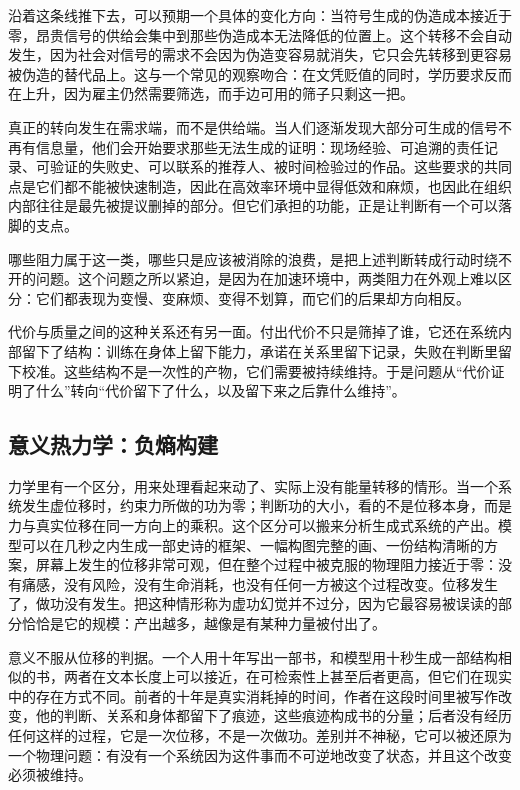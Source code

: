 
沿着这条线推下去，可以预期一个具体的变化方向：当符号生成的伪造成本接近于零，昂贵信号的供给会集中到那些伪造成本无法降低的位置上。这个转移不会自动发生，因为社会对信号的需求不会因为伪造变容易就消失，它只会先转移到更容易被伪造的替代品上。这与一个常见的观察吻合：在文凭贬值的同时，学历要求反而在上升，因为雇主仍然需要筛选，而手边可用的筛子只剩这一把。

真正的转向发生在需求端，而不是供给端。当人们逐渐发现大部分可生成的信号不再有信息量，他们会开始要求那些无法生成的证明：现场经验、可追溯的责任记录、可验证的失败史、可以联系的推荐人、被时间检验过的作品。这些要求的共同点是它们都不能被快速制造，因此在高效率环境中显得低效和麻烦，也因此在组织内部往往是最先被提议删掉的部分。但它们承担的功能，正是让判断有一个可以落脚的支点。

哪些阻力属于这一类，哪些只是应该被消除的浪费，是把上述判断转成行动时绕不开的问题。这个问题之所以紧迫，是因为在加速环境中，两类阻力在外观上难以区分：它们都表现为变慢、变麻烦、变得不划算，而它们的后果却方向相反。

代价与质量之间的这种关系还有另一面。付出代价不只是筛掉了谁，它还在系统内部留下了结构：训练在身体上留下能力，承诺在关系里留下记录，失败在判断里留下校准。这些结构不是一次性的产物，它们需要被持续维持。于是问题从“代价证明了什么”转向“代价留下了什么，以及留下来之后靠什么维持”。

\subsection{意义热力学：负熵构建}


力学里有一个区分，用来处理看起来动了、实际上没有能量转移的情形。当一个系统发生虚位移时，约束力所做的功为零；判断功的大小，看的不是位移本身，而是力与真实位移在同一方向上的乘积。这个区分可以搬来分析生成式系统的产出。模型可以在几秒之内生成一部史诗的框架、一幅构图完整的画、一份结构清晰的方案，屏幕上发生的位移非常可观，但在整个过程中被克服的物理阻力接近于零：没有痛感，没有风险，没有生命消耗，也没有任何一方被这个过程改变。位移发生了，做功没有发生。把这种情形称为虚功幻觉并不过分，因为它最容易被误读的部分恰恰是它的规模：产出越多，越像是有某种力量被付出了。

意义不服从位移的判据。一个人用十年写出一部书，和模型用十秒生成一部结构相似的书，两者在文本长度上可以接近，在可检索性上甚至后者更高，但它们在现实中的存在方式不同。前者的十年是真实消耗掉的时间，作者在这段时间里被写作改变，他的判断、关系和身体都留下了痕迹，这些痕迹构成书的分量；后者没有经历任何这样的过程，它是一次位移，不是一次做功。差别并不神秘，它可以被还原为一个物理问题：有没有一个系统因为这件事而不可逆地改变了状态，并且这个改变必须被维持。

